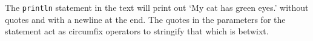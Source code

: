 The \verb|println| statement in the text will print out `My cat has
green eyes.' without quotes and with a newline at the end. The quotes in
the parameters for the statement act as circumfix operators to stringify
that which is betwixt.
